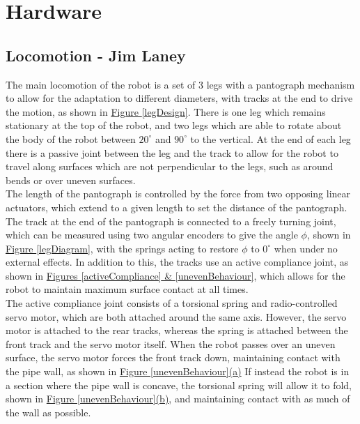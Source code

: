 \documentclass[11pt]{article}		%
\begin{document}
	
	\section{Hardware}
	
		\subsection[Locomotion]{Locomotion - Jim Laney}
			
			The main locomotion of the robot is a set of 3 legs with a pantograph mechanism  to allow for the adaptation to different diameters, with tracks at the end to drive the motion, as shown in \hyperref[legDesign]{Figure \ref*{legDesign}}.
			There is one leg which remains stationary at the top of the robot, and two legs which are able to rotate about the body of the robot between $20^\circ$ and $90^\circ$ to the vertical.
			At the end of each leg there is a passive joint between the leg and the track to allow for the robot to travel along surfaces which are not perpendicular to the legs, such as around bends or over uneven surfaces.
			\\
			The length of the pantograph is controlled by the force from two opposing linear actuators, which extend to a given length to set the distance of the pantograph.
			The track at the end of the pantograph is connected to a freely turning joint, which can be measured using two angular encoders to give the angle $\phi$, shown in \hyperref[legDiagram]{Figure \ref*{legDiagram}}, with the springs acting to restore $\phi$ to $0^\circ$ when under no external effects.
			In addition to this, the tracks use an active compliance joint, as shown in \hyperref[activeCompliance]{Figures \ref*{activeCompliance} \& \ref*{unevenBehaviour}}, which allows for the robot to maintain maximum surface contact at all times.
			\\
			The active compliance joint consists of a torsional spring and radio-controlled servo motor, which are both attached around the same axis.
			However, the servo motor is attached to the rear tracks, whereas the spring is attached between the front track and the servo motor itself.
			When the robot passes over an uneven surface, the servo motor forces the front track down, maintaining contact with the pipe wall, as shown in \hyperref[unevenBehaviour]{Figure \ref*{unevenBehaviour}(a)}
			If instead the robot is in a section where the pipe wall is concave, the torsional spring will allow it to fold, shown in \hyperref[unevenBehaviour]{Figure \ref*{unevenBehaviour}(b)}, and maintaining contact with as much of the wall as possible.
\end{document}
